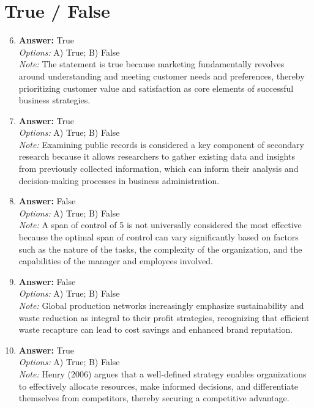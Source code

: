 \documentclass[12pt]{article}
\begin{document}
\section*{True / False}
\begin{enumerate}[label=\arabic*.]
\setcounter{enumi}{5}
\item \textbf{Answer:} True
\\ \textit{Options:} A) True; B) False
\\ \textit{Note:} The statement is true because marketing fundamentally revolves around understanding and meeting customer needs and preferences, thereby prioritizing customer value and satisfaction as core elements of successful business strategies.
\item \textbf{Answer:} True
\\ \textit{Options:} A) True; B) False
\\ \textit{Note:} Examining public records is considered a key component of secondary research because it allows researchers to gather existing data and insights from previously collected information, which can inform their analysis and decision-making processes in business administration.
\item \textbf{Answer:} False
\\ \textit{Options:} A) True; B) False
\\ \textit{Note:} A span of control of 5 is not universally considered the most effective because the optimal span of control can vary significantly based on factors such as the nature of the tasks, the complexity of the organization, and the capabilities of the manager and employees involved.
\item \textbf{Answer:} False
\\ \textit{Options:} A) True; B) False
\\ \textit{Note:} Global production networks increasingly emphasize sustainability and waste reduction as integral to their profit strategies, recognizing that efficient waste recapture can lead to cost savings and enhanced brand reputation.
\item \textbf{Answer:} True
\\ \textit{Options:} A) True; B) False
\\ \textit{Note:} Henry (2006) argues that a well-defined strategy enables organizations to effectively allocate resources, make informed decisions, and differentiate themselves from competitors, thereby securing a competitive advantage.
\end{enumerate}
\end{document}
